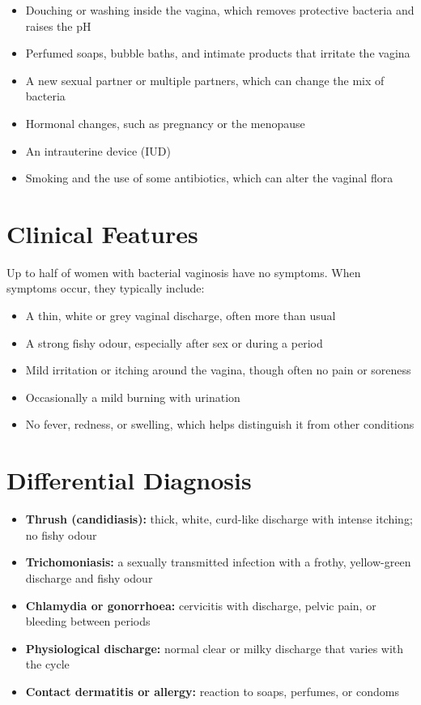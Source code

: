 \begin{itemize}
    \item Douching or washing inside the vagina, which removes protective bacteria and raises the pH
    \item Perfumed soaps, bubble baths, and intimate products that irritate the vagina
    \item A new sexual partner or multiple partners, which can change the mix of bacteria
    \item Hormonal changes, such as pregnancy or the menopause
    \item An intrauterine device (IUD)
    \item Smoking and the use of some antibiotics, which can alter the vaginal flora
\end{itemize}

\section*{Clinical Features}
Up to half of women with bacterial vaginosis have no symptoms. When symptoms occur, they typically include:

\begin{itemize}
    \item A thin, white or grey vaginal discharge, often more than usual
    \item A strong fishy odour, especially after sex or during a period
    \item Mild irritation or itching around the vagina, though often no pain or soreness
    \item Occasionally a mild burning with urination
    \item No fever, redness, or swelling, which helps distinguish it from other conditions
\end{itemize}

\section*{Differential Diagnosis}
\begin{itemize}
    \item \textbf{Thrush (candidiasis):} thick, white, curd-like discharge with intense itching; no fishy odour
    \item \textbf{Trichomoniasis:} a sexually transmitted infection with a frothy, yellow-green discharge and fishy odour
    \item \textbf{Chlamydia or gonorrhoea:} cervicitis with discharge, pelvic pain, or bleeding between periods
    \item \textbf{Physiological discharge:} normal clear or milky discharge that varies with the cycle
    \item \textbf{Contact dermatitis or allergy:} reaction to soaps, perfumes, or condoms
\end{itemize}

